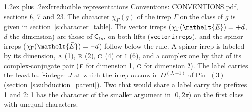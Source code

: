 \documentclass[10pt,a4paper]{article}
\makeatletter
\renewcommand\section{\@startsection{section}{1}{\z@}{-3ex plus -1ex minus -.2ex}%
  {1.2ex plus .2ex}{\normalfont\large\sffamily\bfseries\color{parttitle}}}
\numberwithin{equation}{section}
\newcommand{\eltfont}[1]{{\let\sigma\eltsigma\mathelt{#1}}}
\newcommand{\grp}[1]{\mathsf{#1}}
\newcommand{\irr}[1]{\text{\normalfont\scshape #1}}
\newcommand{\elt}[1]{\eltfont{#1}}
\newcommand{\irrJp}[2]{D^{(#1,#2)}}
\newcommand{\irchar}[1]{\chi_{#1}}
\newcommand{\barred}[1]{\bar{#1}}
\makeatother
\begin{document}
\section{Irreducible representations}\label{s:irreps}
Conventions: \href{../../CONVENTIONS.pdf}{CONVENTIONS.pdf}, sections \href{../../../rotation/CONVENTIONS.pdf\#conv.6}{6}, \href{../../../rotation/CONVENTIONS.pdf\#conv.7}{7} and \href{../../CONVENTIONS.pdf\#conv.23}{23}.
\leavevmode\label{n:function.character}\label{n:irrep.Gamma}The character $\irchar{\Gamma}(g)$ of the irrep $\Gamma$ on the class of $g$ is given in section~\ref{s:character_table}. \label{n:index.dimension}The vector irreps ($\irchar{\Gamma}(\elt{\barred{E}}) = +d$, $d$ the dimension) are those of \href{../../../rotation/data/pdf/C1v.pdf}{$\grp{C_{1v}}$}, on both lifts (\texttt{vectorirreps}), and the spinor irreps ($\irchar{\Gamma}(\elt{\barred{E}}) = -d$) follow below the rule. A spinor irrep is labeled by its dimension, $\irr{a}$ (1), $\irr{e}$ (2), $\irr{g}$ (4) or $\irr{i}$ (6), and a complex one by that of its complex-conjugate pair ($\irr{e}$ for dimension 1, $\irr{g}$ for dimension 2). The label carries the least half-integer $J$ at which the irrep occurs in $\irrJp{J}{+1}$ of $\grp{Pin^{-}(3)}$ (section~\ref{s:subduction_parent}). Two that would share a label carry the prefixes 1 and 2: 1 has the character of the smaller argument in $[0, 2\pi)$ on the first class with unequal characters.
\end{document}
